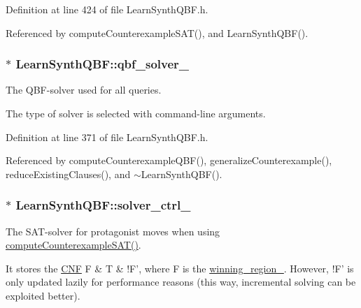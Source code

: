 Definition at line 424 of file Learn\-Synth\-Q\-B\-F.\-h.



Referenced by compute\-Counterexample\-S\-A\-T(), and Learn\-Synth\-Q\-B\-F().

\hypertarget{classLearnSynthQBF_a8b4c4279f543a0adea992fccf22009f4}{
\subsubsection[{qbf\-\_\-solver\-\_\-}]{$\ast$ Learn\-Synth\-Q\-B\-F\-::qbf\-\_\-solver\-\_\-\hspace{0.3cm}{\ttfamily [protected]}}}\label{classLearnSynthQBF_a8b4c4279f543a0adea992fccf22009f4}


The Q\-B\-F-\/solver used for all queries. 

The type of solver is selected with command-\/line arguments. 

Definition at line 371 of file Learn\-Synth\-Q\-B\-F.\-h.



Referenced by compute\-Counterexample\-Q\-B\-F(), generalize\-Counterexample(), reduce\-Existing\-Clauses(), and $\sim$\-Learn\-Synth\-Q\-B\-F().

\hypertarget{classLearnSynthQBF_a14f20d46129ad1fe2db8272348a7e589}{
\subsubsection[{solver\-\_\-ctrl\-\_\-}]{$\ast$ Learn\-Synth\-Q\-B\-F\-::solver\-\_\-ctrl\-\_\-\hspace{0.3cm}{\ttfamily [protected]}}}\label{classLearnSynthQBF_a14f20d46129ad1fe2db8272348a7e589}


The S\-A\-T-\/solver for protagonist moves when using \hyperlink{classLearnSynthQBF_a3221800bf3f040b66b8a790bab4c82b5}{compute\-Counterexample\-S\-A\-T()}. 

It stores the \hyperlink{classCNF}{C\-N\-F} F \& T \& !\-F', where F is the \hyperlink{classLearnSynthQBF_a9c6b41f7df5f4ed4bfc5930136fc1152}{winning\-\_\-region\-\_\-}. However, !\-F' is only updated lazily for performance reasons (this way, incremental solving can be exploited better). 

